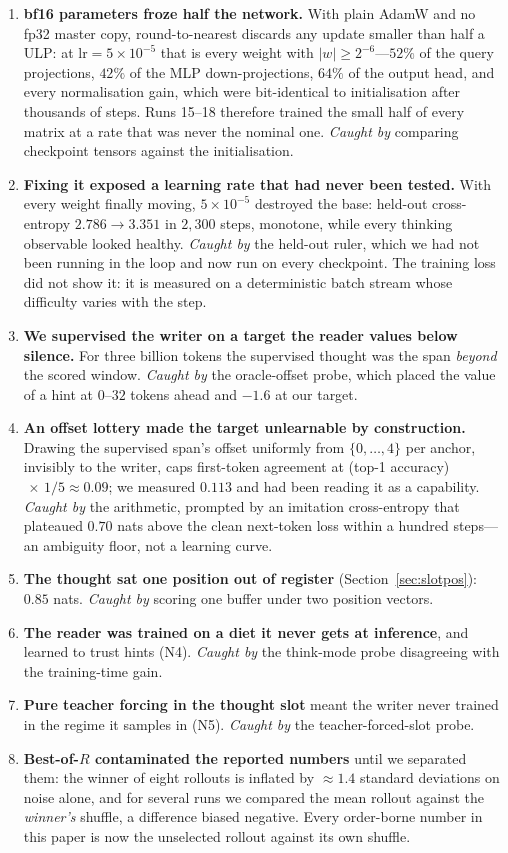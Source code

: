 \documentclass{article} %
\begin{document}
\begin{enumerate}
\item \textbf{bf16 parameters froze half the network.} With plain AdamW and no fp32 master copy, round-to-nearest discards any update smaller than half a ULP: at $\mathrm{lr}=5\times10^{-5}$ that is every weight with $|w| \ge 2^{-6}$---$52\%$ of the query projections, $42\%$ of the MLP down-projections, $64\%$ of the output head, and every normalisation gain, which were bit-identical to initialisation after thousands of steps. Runs 15--18 therefore trained the small half of every matrix at a rate that was never the nominal one. \emph{Caught by} comparing checkpoint tensors against the initialisation.
\item \textbf{Fixing it exposed a learning rate that had never been tested.} With every weight finally moving, $5\times10^{-5}$ destroyed the base: held-out cross-entropy $2.786 \to 3.351$ in $2{,}300$ steps, monotone, while every thinking observable looked healthy. \emph{Caught by} the held-out ruler, which we had not been running in the loop and now run on every checkpoint. The training loss did not show it: it is measured on a deterministic batch stream whose difficulty varies with the step.
\item \textbf{We supervised the writer on a target the reader values below silence.} For three billion tokens the supervised thought was the span \emph{beyond} the scored window. \emph{Caught by} the oracle-offset probe, which placed the value of a hint at $0$--$32$ tokens ahead and $-1.6$ at our target.
\item \textbf{An offset lottery made the target unlearnable by construction.} Drawing the supervised span's offset uniformly from $\{0,\dots,4\}$ per anchor, invisibly to the writer, caps first-token agreement at (top-1 accuracy)$\,\times\,1/5 \approx 0.09$; we measured $0.113$ and had been reading it as a capability. \emph{Caught by} the arithmetic, prompted by an imitation cross-entropy that plateaued $0.70$ nats above the clean next-token loss within a hundred steps---an ambiguity floor, not a learning curve.
\item \textbf{The thought sat one position out of register} (Section~\ref{sec:slotpos}): $0.85$ nats. \emph{Caught by} scoring one buffer under two position vectors.
\item \textbf{The reader was trained on a diet it never gets at inference}, and learned to trust hints (N4). \emph{Caught by} the think-mode probe disagreeing with the training-time gain.
\item \textbf{Pure teacher forcing in the thought slot} meant the writer never trained in the regime it samples in (N5). \emph{Caught by} the teacher-forced-slot probe.
\item \textbf{Best-of-$R$ contaminated the reported numbers} until we separated them: the winner of eight rollouts is inflated by $\approx 1.4$ standard deviations on noise alone, and for several runs we compared the mean rollout against the \emph{winner's} shuffle, a difference biased negative. Every order-borne number in this paper is now the unselected rollout against its own shuffle.
\end{enumerate}
\end{document}
